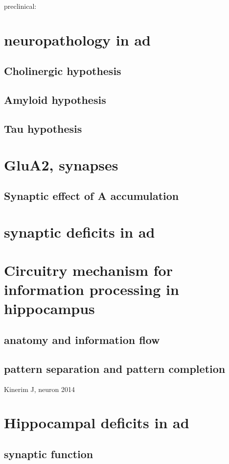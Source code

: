 preclinical: \citep{malek-ahmadi16} \citep{reiman16}

\section{neuropathology in \gls{ad}}
\subsection{Cholinergic hypothesis\label{ach-hypo}}
\subsection{Amyloid hypothesis}
\subsection{Tau hypothesis}


\section{GluA2, synapses}
\subsection{Synaptic effect of A\textbeta{} accumulation}

\section{synaptic deficits in \gls{ad}}

\section{Circuitry mechanism for information processing in hippocampus}
\subsection{anatomy and information flow}
\subsection{pattern separation and pattern completion}
    Kinerim J, neuron 2014

\section{Hippocampal deficits in \gls{ad}}
\subsection{synaptic function}
